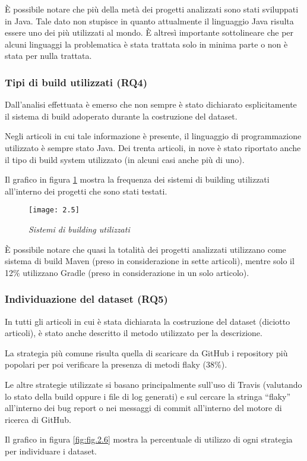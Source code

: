 È possibile notare che più della metà dei progetti analizzati sono stati sviluppati in Java. Tale dato non stupisce in quanto attualmente il linguaggio Java risulta essere uno dei più utilizzati al mondo. È altresì importante sottolineare che per alcuni linguaggi la problematica è stata trattata solo in minima parte o non è stata per nulla trattata.
\subsubsection{Tipi di build utilizzati (RQ4)}
Dall’analisi effettuata è emerso che non sempre è stato dichiarato
esplicitamente il sistema di build adoperato durante la costruzione del dataset.

Negli articoli in cui tale informazione è presente, il linguaggio di programmazione utilizzato è sempre stato Java. Dei trenta articoli, in nove è stato riportato anche il tipo di build system utilizzato (in alcuni casi anche più di uno).

Il grafico in figura \ref{fig:fig.2.5} mostra la frequenza dei sistemi di building utilizzati
all’interno dei progetti che sono stati testati.
\begin{figure}[h]
	\centering
	\texttt{[image: 2.5]}
	\caption{\emph{Sistemi di building utilizzati}}
	\label{fig:fig.2.5}
\end{figure}

È possibile notare che quasi la totalità dei progetti analizzati utilizzano come sistema di build Maven (preso in considerazione in sette articoli), mentre solo il 12\% utilizzano Gradle (preso in considerazione in un solo articolo).
\subsubsection{Individuazione del dataset (RQ5)}
In tutti gli articoli in cui è stata dichiarata la costruzione del dataset (diciotto articoli), è stato anche descritto il metodo utilizzato per la descrizione.

La strategia più comune risulta quella di scaricare da GitHub i repository più popolari per poi verificare la presenza di metodi flaky (38\%).

Le altre strategie utilizzate si basano principalmente sull’uso di Travis (valutando lo stato della build oppure i file di log generati) e sul cercare la stringa “flaky” all’interno dei bug report o nei messaggi di commit all’interno del motore di ricerca di GitHub.

Il grafico in figura \ref{fig:fig.2.6} mostra la percentuale di utilizzo di ogni strategia per individuare i dataset.

